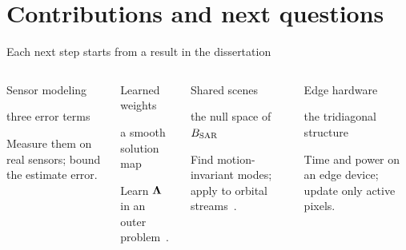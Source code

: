 \section{Contributions and next questions}
\begin{frame}{Each next step starts from a result in the dissertation}
\vfill
\begin{columns}[T]
\begin{block}{Sensor modeling}\begin{minipage}[t][2.9cm][t]{\linewidth}\raggedright
{\small\color{teal}three error terms}\par\smallskip
Measure them on real sensors; bound the estimate error.
\end{minipage}\end{block}
\begin{block}{Learned weights}\begin{minipage}[t][2.9cm][t]{\linewidth}\raggedright
{\small\color{teal}a smooth solution map}\par\smallskip
Learn $\bm\Lambda$ in an outer problem~\cite{antil2020bilevel}.
\end{minipage}\end{block}
\begin{block}{Shared scenes}\begin{minipage}[t][2.9cm][t]{\linewidth}\raggedright
{\small\color{teal}the null space of $B_{\rm SAR}$}\par\smallskip
Find motion-invariant modes; apply to orbital streams~\cite{antil2026esareventbasedsyntheticaperture}.
\end{minipage}\end{block}
\begin{block}{Edge hardware}\begin{minipage}[t][2.9cm][t]{\linewidth}\raggedright
{\small\color{teal}the tridiagonal structure}\par\smallskip
Time and power on an edge device; update only active pixels.
\end{minipage}\end{block}
\end{columns}
\vfill

\end{frame}
